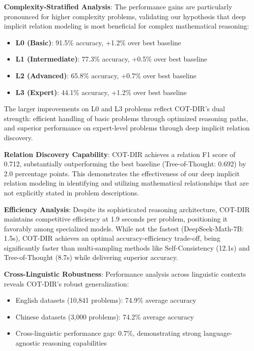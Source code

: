\textbf{Complexity-Stratified Analysis}: The performance gains are particularly pronounced for higher complexity problems, validating our hypothesis that deep implicit relation modeling is most beneficial for complex mathematical reasoning:

\begin{itemize}
    \item \textbf{L0 (Basic)}: 91.5\% accuracy, +1.2\% over best baseline
    \item \textbf{L1 (Intermediate)}: 77.3\% accuracy, +0.5\% over best baseline  
    \item \textbf{L2 (Advanced)}: 65.8\% accuracy, +0.7\% over best baseline
    \item \textbf{L3 (Expert)}: 44.1\% accuracy, +1.2\% over best baseline
\end{itemize}

The larger improvements on L0 and L3 problems reflect COT-DIR's dual strength: efficient handling of basic problems through optimized reasoning paths, and superior performance on expert-level problems through deep implicit relation discovery.

\textbf{Relation Discovery Capability}: COT-DIR achieves a relation F1 score of 0.712, substantially outperforming the best baseline (Tree-of-Thought: 0.692) by 2.0 percentage points. This demonstrates the effectiveness of our deep implicit relation modeling in identifying and utilizing mathematical relationships that are not explicitly stated in problem descriptions.

\textbf{Efficiency Analysis}: Despite its sophisticated reasoning architecture, COT-DIR maintains competitive efficiency at 1.9 seconds per problem, positioning it favorably among specialized models. While not the fastest (DeepSeek-Math-7B: 1.5s), COT-DIR achieves an optimal accuracy-efficiency trade-off, being significantly faster than multi-sampling methods like Self-Consistency (12.1s) and Tree-of-Thought (8.7s) while delivering superior accuracy.

\textbf{Cross-Linguistic Robustness}: Performance analysis across linguistic contexts reveals COT-DIR's robust generalization:
\begin{itemize}
    \item English datasets (10,841 problems): 74.9\% average accuracy
    \item Chinese datasets (3,000 problems): 74.2\% average accuracy
    \item Cross-linguistic performance gap: 0.7\%, demonstrating strong language-agnostic reasoning capabilities
\end{itemize}

